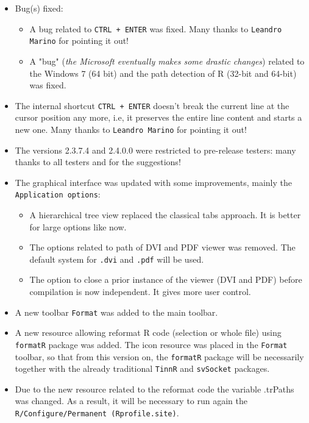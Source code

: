 \begin{itemize}
  \item Bug(s) fixed:
    \begin{itemize}
      \item A bug related to \texttt{CTRL + ENTER} was fixed. Many thanks to \texttt{Leandro Marino} for pointing it out!
      \item A "bug" (\textit{the Microsoft eventually makes some drastic changes}) related to the Windows 7 (64 bit)
        and the path detection of R (32-bit and 64-bit) was fixed.
    \end{itemize}
  \item The internal shortcut \texttt{CTRL + ENTER} doesn't break the current line at the cursor position any more, i.e, it preserves
    the entire line content and starts a new one. Many thanks to \texttt{Leandro Marino} for pointing it out!
  \item The versions 2.3.7.4 and 2.4.0.0 were restricted to pre-release testers: many thanks to all testers and for the suggestions!
  \item The graphical interface was updated with some improvements, mainly the \texttt{Application options}:
    \begin{itemize}
      \item A hierarchical tree view replaced the classical tabs approach. It is better for large options like now.
      \item The options related to path of DVI and PDF viewer was removed. The default system for \texttt{.dvi} and \texttt{.pdf} will be used.
      \item The option to close a prior instance of the viewer (DVI and PDF) before compilation is now independent. It gives more user control.
    \end{itemize}
  \item A new toolbar \texttt{Format} was added to the main toolbar.
  \item A new resource allowing reformat R code (selection or whole file) using \texttt{formatR} package was added. 
    The icon resource was placed in the \texttt{Format} toolbar, so that from this version on,
    the \texttt{formatR} package will be necessarily together with the already traditional \texttt{TinnR} and \texttt{svSocket} packages.
  \item Due to the new resource related to the reformat code the variable .trPaths was changed. As a result,
    it will be necessary to run again the \texttt{R/Configure/Permanent (Rprofile.site)}.

\end{itemize}
